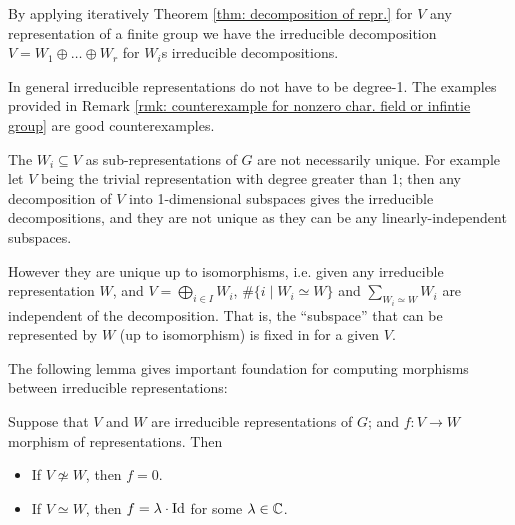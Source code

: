 \documentclass{article}
\begin{document}
\begin{corollary}
    By applying iteratively Theorem \ref{thm: decomposition of repr.} for $V$ any representation of a finite group we have the irreducible decomposition $V = W_1 \oplus \dots \oplus W_r$ for $W_i$s irreducible decompositions.
\end{corollary}

\begin{remark}
    In general irreducible representations do not have to be degree-1. The examples provided in Remark \ref{rmk: counterexample for nonzero char. field or infintie group} are good counterexamples. 
\end{remark}

\begin{remark}\label{rmk: decomposition of repr. unique up to isom}
    The $W_i \subseteq V$ as sub-representations of $G$ are not necessarily unique. For example let $V$ being the trivial representation with degree greater than 1; then any decomposition of $V$ into 1-dimensional subspaces gives the irreducible decompositions, and they are not unique as they can be any linearly-independent subspaces.

    However they are unique up to isomorphisms, i.e. given any irreducible representation $W$, and $V = \bigoplus_{i \in I} W_i$, $\#\{ i \mid W_i \simeq W \}$ and $\sum_{W_i \simeq W} W_i$ are independent of the decomposition. That is, the ``subspace'' that can be represented by $W$ (up to isomorphism) is fixed in for a given $V$. 
\end{remark}

\textstart
The following lemma gives important foundation for computing morphisms between irreducible representations:

\begin{lemma}[Schur]\label{lem: Schur}
    Suppose that $V$ and $W$ are irreducible representations of $G$; and $f: V \to W$ morphism of representations. Then
    \begin{itemize}
        \item If $V \nsimeq W$, then $f = 0$.
        \item If $V \simeq W$, then $f = \lambda\cdot\mathrm{Id}$ for some $\lambda \in \mathbb{C}$.
    \end{itemize}
\end{lemma}
\end{document}
